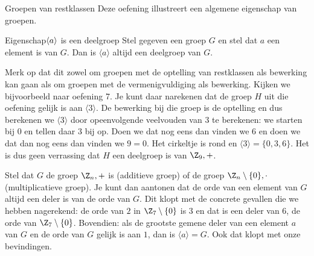 \begin{lesactiviteit}{Groepen van restklassen}
Deze oefening illustreert een algemene eigenschap van groepen. 
\vspace{0.5cm}
\begin{kader}{Eigenschap}{$\boldmath{\langle a\rangle}$ is een deelgroep}
	Stel gegeven een groep $G$ en stel dat $a$ een element is van $G$. Dan is $\langle a\rangle$ altijd een deelgroep van $G$.
\end{kader}
Merk op dat dit zowel om groepen met de optelling van restklassen als bewerking kan gaan als om groepen met de vermenigvuldiging als bewerking. Kijken we bijvoorbeeld naar oefening 7. Je kunt daar narekenen dat de groep $H$ uit die oefening gelijk is aan $\langle 3\rangle$. De bewerking bij die groep is de optelling en dus berekenen we $\langle 3\rangle$ door opeenvolgende veelvouden van $3$ te berekenen: we starten bij $0$ en tellen daar $3$ bij op. Doen we dat nog eens dan vinden we $6$ en doen we dat dan nog eens dan vinden we $9=0$. Het cirkeltje is rond en $\langle 3\rangle=\{0,3,6\}$. Het is dus geen verrassing dat $H$ een deelgroep is van $\Z_9,+$. 

Stel dat $G$ de groep $\Z_n,+$ is (additieve groep) of de groep $\Z_n\setminus \{0\},\cdot$  (multiplicatieve groep). Je kunt dan aantonen dat de orde van een element van $G$ altijd een deler is van de orde van $G$. Dit klopt met de concrete gevallen die we hebben nagerekend: de orde van $2$ in $\Z_7\setminus \{0\}$ is $3$ en dat is een deler van $6$, de orde van $\Z_7\setminus \{0\}$. Bovendien: als de grootste gemene deler van een element $a$ van $G$ en de orde van $G$ gelijk is aan $1$, dan is $\langle a\rangle=G$. Ook dat klopt met onze bevindingen.

\begin{vraagenantwoord}[resume]


		

\end{vraagenantwoord}
\end{lesactiviteit}
